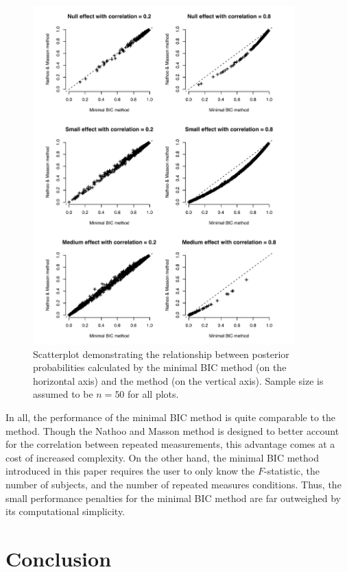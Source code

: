 \documentclass[12pt,twoside,a4paper]{article}
\begin{document}
\begin{figure}
  \centering
  \includegraphics[width=0.9\textwidth]{cors.pdf}
  \caption{Scatterplot demonstrating the relationship between posterior probabilities calculated by the minimal BIC method (on the horizontal axis) and the \citet{nathoo2016} method (on the vertical axis). Sample size is assumed to be $n=50$ for all plots.}
  \label{fig:cors}
\end{figure}

In all, the performance of the minimal BIC method is quite comparable to the \citet{nathoo2016} method. Though the Nathoo and Masson method is designed to better account for the correlation between repeated measurements, this advantage comes at a cost of increased complexity. On the other hand, the minimal BIC method introduced in this paper requires the user to only know the $F$-statistic, the number of subjects, and the number of repeated measures conditions. Thus, the small performance penalties for the minimal BIC method are far outweighed by its computational simplicity.

\section{Conclusion}
\end{document}
